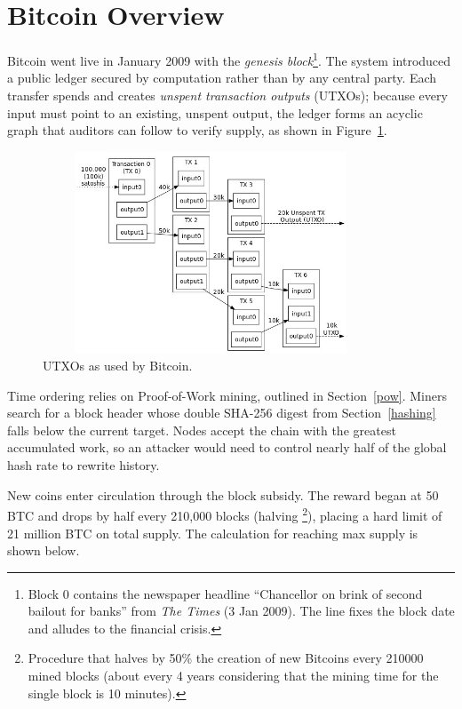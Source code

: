 \section{Bitcoin Overview}
\label{sec:bitcoin_overview}

Bitcoin went live in January 2009 with the \textit{genesis block}\footnote{Block 0 contains the newspaper headline “Chancellor on brink of second bailout for banks” from \textit{The Times} (3 Jan 2009). The line fixes the block date and alludes to the financial crisis. }.  The system introduced a public ledger secured by computation rather than by any central party.  Each transfer spends and creates \textit{unspent transaction outputs} (UTXOs); because every input must point to an existing, unspent output, the ledger forms an acyclic graph that auditors can follow to verify supply, as shown in Figure~\ref{utxos}.

\begin{figure}[h]
    \centering
    \includegraphics[width=10cm,height=6cm]{Images/Chap1/utxos.jpg}
    \caption[UTXOs]{UTXOs as used by Bitcoin. \cite{utxos}}
    \label{utxos}
\end{figure}

Time ordering relies on Proof-of-Work mining, outlined in Section~\ref{pow}.  Miners search for a block header whose double SHA-256 digest from Section~\ref{hashing} falls below the current target.  Nodes accept the chain with the greatest accumulated work, so an attacker would need to control nearly half of the global hash rate to rewrite history.

New coins enter circulation through the block subsidy.  The reward began at 50 BTC and drops by half every 210,000 blocks (halving \footnote{Procedure that halves by 50\% the creation of new Bitcoins every 210000 mined blocks (about every 4 years
considering that the mining time for the single block is 10 minutes).}), placing a hard limit of 21 million BTC on total supply. The calculation for reaching max supply is shown below.

